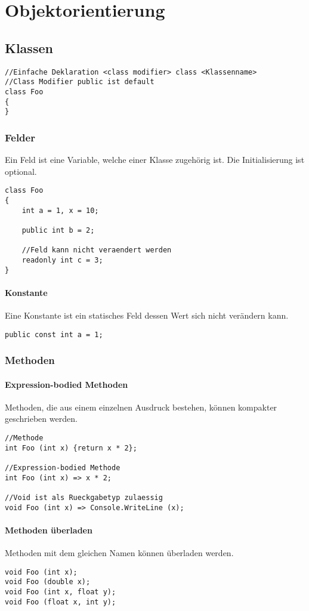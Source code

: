 \chapter{Objektorientierung} 
\section{Klassen}
\begin{lstlisting}
//Einfache Deklaration <class modifier> class <Klassenname>
//Class Modifier public ist default
class Foo
{
}
\end{lstlisting}
\subsection{Felder}
Ein Feld ist eine Variable, welche einer Klasse zugehörig ist. Die Initialisierung ist optional.
\begin{lstlisting}
class Foo
{
	int a = 1, x = 10;
	
	public int b = 2;

	//Feld kann nicht veraendert werden
	readonly int c = 3;
}
\end{lstlisting}
\subsubsection{Konstante}
Eine Konstante ist ein statisches Feld dessen Wert sich nicht verändern kann.
\begin{lstlisting}
public const int a = 1;
\end{lstlisting}
\subsection{Methoden}
\subsubsection{Expression-bodied Methoden}
Methoden, die aus einem einzelnen Ausdruck bestehen, können kompakter geschrieben werden.
\begin{lstlisting}
//Methode
int Foo (int x) {return x * 2};

//Expression-bodied Methode
int Foo (int x) => x * 2;

//Void ist als Rueckgabetyp zulaessig
void Foo (int x) => Console.WriteLine (x);
\end{lstlisting}
\subsubsection{Methoden überladen}
Methoden mit dem gleichen Namen können überladen werden.
\begin{lstlisting}
void Foo (int x);
void Foo (double x);
void Foo (int x, float y);
void Foo (float x, int y);
\end{lstlisting}
